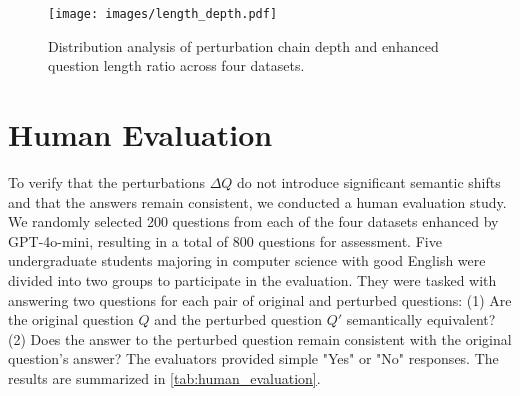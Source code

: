 \begin{figure}[htbp]
    \centering
    \texttt{[image: images/length\_depth.pdf]}
    \caption{Distribution analysis of perturbation chain depth and enhanced question length ratio across four datasets.}
    \label{fig:length_depth}
\end{figure}

\section{Human Evaluation} 
To verify that the perturbations \( \Delta Q \) do not introduce significant semantic shifts and that the answers remain consistent, we conducted a human evaluation study. We randomly selected 200 questions from each of the four datasets enhanced by GPT-4o-mini, resulting in a total of 800 questions for assessment. Five undergraduate students majoring in computer science with good English were divided into two groups to participate in the evaluation. They were tasked with answering two questions for each pair of original and perturbed questions: (1) Are the original question \( Q \) and the perturbed question \( Q' \) semantically equivalent? (2) Does the answer to the perturbed question remain consistent with the original question's answer? The evaluators provided simple "Yes" or "No" responses. The results are summarized in \autoref{tab:human_evaluation}.

\begin{table}[htbp]
    \centering
    \small
    \setlength{\tabcolsep}{4pt} 
    \renewcommand{\arraystretch}{1.1}
    \caption{Results of human evaluation on semantic equivalence (Semantic Eq.) and answer consistency (Answer Consis.) between original and perturbed questions.}
    \label{tab:human_evaluation}
\end{table}




